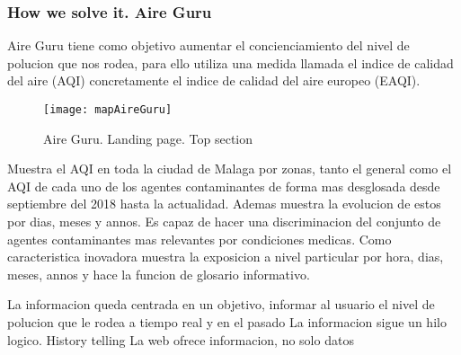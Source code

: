 \subsubsection{How we solve it. Aire Guru} 
Aire Guru tiene como objetivo aumentar el concienciamiento del nivel de polucion que nos rodea, para ello utiliza una medida llamada
el indice de calidad del aire (AQI) concretamente el indice de calidad del aire europeo (EAQI).

\newpage
\begin{figure}[ht]
    \centering
    \texttt{[image: mapAireGuru]}
    \caption{Aire Guru. Landing page. Top section}
\end{figure}

Muestra el AQI en toda la ciudad de Malaga por zonas, tanto el general como el AQI de cada uno de los agentes
contaminantes de forma mas desglosada desde septiembre del 2018 hasta la actualidad. Ademas muestra la evolucion
de estos por dias, meses y annos.
Es capaz de hacer una discriminacion del conjunto de agentes contaminantes mas relevantes por condiciones medicas.
Como caracteristica inovadora muestra la exposicion a nivel particular por hora, dias, meses, annos y hace la funcion de 
glosario informativo.


\begin{itemize}
\done La informacion queda centrada en un objetivo, informar al usuario el nivel de polucion que le rodea a tiempo real
y en el pasado
\done La informacion sigue un hilo logico. History telling
\done La web ofrece informacion, no solo datos
\end{itemize}

\newpage